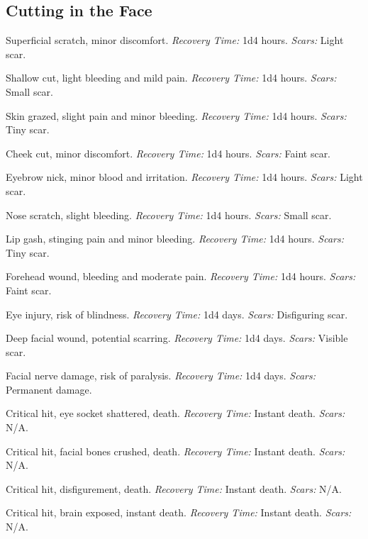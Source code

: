 \subsection{Cutting in the Face}

\begin{description}[labelwidth=1.5em, leftmargin=*, itemsep=0.4em]
    \item[1 -] Superficial scratch, minor discomfort. \textit{Recovery Time:} 1d4 hours. \textit{Scars:} Light scar.
    \item[2 -] Shallow cut, light bleeding and mild pain. \textit{Recovery Time:} 1d4 hours. \textit{Scars:} Small scar.
    \item[3 -] Skin grazed, slight pain and minor bleeding. \textit{Recovery Time:} 1d4 hours. \textit{Scars:} Tiny scar.
    \item[4 -] Cheek cut, minor discomfort. \textit{Recovery Time:} 1d4 hours. \textit{Scars:} Faint scar.
    \item[5 -] Eyebrow nick, minor blood and irritation. \textit{Recovery Time:} 1d4 hours. \textit{Scars:} Light scar.
    \item[6 -] Nose scratch, slight bleeding. \textit{Recovery Time:} 1d4 hours. \textit{Scars:} Small scar.
    \item[7 -] Lip gash, stinging pain and minor bleeding. \textit{Recovery Time:} 1d4 hours. \textit{Scars:} Tiny scar.
    \item[8 -] Forehead wound, bleeding and moderate pain. \textit{Recovery Time:} 1d4 hours. \textit{Scars:} Faint scar.
    \item[9 -] Eye injury, risk of blindness. \textit{Recovery Time:} 1d4 days. \textit{Scars:} Disfiguring scar.
    \item[10 -] Deep facial wound, potential scarring. \textit{Recovery Time:} 1d4 days. \textit{Scars:} Visible scar.
    \item[11 -] Facial nerve damage, risk of paralysis. \textit{Recovery Time:} 1d4 days. \textit{Scars:} Permanent damage.
    \item[12 -] Critical hit, eye socket shattered, death. \textit{Recovery Time:} Instant death. \textit{Scars:} N/A.
    \item[13 -] Critical hit, facial bones crushed, death. \textit{Recovery Time:} Instant death. \textit{Scars:} N/A.
    \item[14 -] Critical hit, disfigurement, death. \textit{Recovery Time:} Instant death. \textit{Scars:} N/A.
    \item[15 -] Critical hit, brain exposed, instant death. \textit{Recovery Time:} Instant death. \textit{Scars:} N/A.

\end{description}
